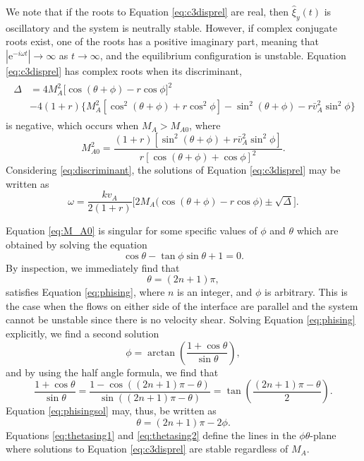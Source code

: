 We note that if the roots to Equation \eqref{eq:c3disprel} are real, then $\hat \xi_y (t)$ is oscillatory and the system is neutrally stable.
However, if complex conjugate roots exist, one of the roots has a positive imaginary part, meaning that $|\mathrm{e}^{-i \omega t}| \to \infty$ as $t \to \infty$\/, and the equilibrium configuration is unstable.
Equation \eqref{eq:c3disprel} has complex roots when its discriminant,
%
\begin{align}
\begin{split}
\label{eq:discriminant}
\Delta
& = 4 M_A^2 \big[ \cos(\theta + \phi) - r \cos\phi \big]^2
\\
& - 4 (1 + r) \big\{ M_A^2 [ \cos^2(\theta + \phi) + r \cos^2\phi ]
- \sin^2(\theta + \phi)
- r \bar v_{A}^2 \sin^2\phi
\big\}
\end{split}
\end{align}
%
is negative, which occurs when $M_A > M_{A0}$, where 
%
\begin{equation}
\label{eq:M_A0}
M_{A0}^2 = \frac{(1 + r) [ \sin^2(\theta + \phi) + r \bar v_{A}^2 \sin^2\phi ] }
{r [ \cos(\theta + \phi) + \cos\phi ]^2}.
\end{equation}
%
Considering \eqref{eq:discriminant}, the solutions of Equation \eqref{eq:c3disprel} may be written as
%
\begin{equation}
\label{eq:c3disprelsol}
\omega = \frac{k v_A}{2 (1 + r)}
\bigg[ 2 M_A \big(\cos(\theta + \phi) - r \cos\phi \big) \pm \sqrt{\Delta} \bigg].
\end{equation}
%

Equation \eqref{eq:M_A0} is singular for some specific values of $\phi$ and $\theta$ which are obtained by solving the equation 
\begin{equation}
\label{eq:phising}
\cos\theta - \tan\phi \sin\theta + 1 = 0.
\end{equation}
By inspection, we immediately find that
\begin{equation}
\label{eq:thetasing1}
\theta=(2n+1)\pi,
\end{equation}
satisfies Equation \eqref{eq:phising}, where $n$ is an integer, and $\phi$ is arbitrary.
This is the case when the flows on either side of the interface are parallel and the system cannot be unstable since there is no velocity shear.
Solving Equation \eqref{eq:phising} explicitly, we find a second solution
\begin{equation}
\label{eq:phisingsol}
\phi = \arctan\left( \frac{1 + \cos\theta}{\sin\theta} \right),
\end{equation}
and by using the half angle formula, we find that
\[
\frac{1 + \cos\theta}{\sin\theta} = \frac{1 - \cos\left((2n+1)\pi - \theta\right)}{\sin\left((2n+1)\pi - \theta\right)} = \tan\left(\frac{(2n+1)\pi - \theta}{2} \right).
\]
Equation \eqref{eq:phisingsol} may, thus, be written as
\begin{equation}
\label{eq:thetasing2}
\theta = (2n+1)\pi - 2 \phi.
\end{equation}
Equations \eqref{eq:thetasing1} and \eqref{eq:thetasing2} define the lines in the $\phi\theta$-plane where solutions to Equation \eqref{eq:c3disprel} are stable regardless of $M_A$.

